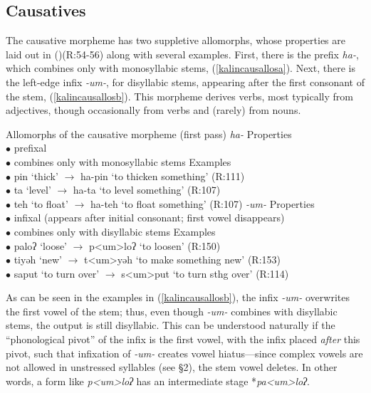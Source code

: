 \documentclass[output=paper,colorlinks,citecolor=brown,
]{langscibook}
\newcounter{nexttmp}    %
\newcommand{\Next}{\setcounter{nexttmp}{\value{equation}}\stepcounter{nexttmp}(\thenexttmp)\xspace}
\begin{document}
\subsection{Causatives}

The causative morpheme has two suppletive allomorphs, whose properties are laid out in \Next (R:54-56) along with several examples. First, there is the prefix  \textit{ha-}, which combines only with monosyllabic stems, (\ref{kalincausallosa}). Next, there is the left-edge infix \textit{-um-}, for disyllabic stems, appearing after the first consonant of the stem, (\ref{kalincausallosb}). This morpheme derives verbs, most typically from adjectives, though occasionally from verbs and (rarely) from nouns.

\ea Allomorphs of the causative morpheme (first pass) \label{kalincausallos}
\ea \textit{ha-}\label{kalincausallosa}
\ea  Properties\\
$\bullet$ prefixal\\
$\bullet$ combines only with monosyllabic stems
\ex Examples\\
$\bullet$ pin `thick' $\rightarrow$ ha-pin `to thicken something' \hfill (R:111)\\
$\bullet$ ta `level' $\rightarrow$ ha-ta `to level something' \hfill (R:107)\\
$\bullet$ teh `to float' $\rightarrow$ ha-teh `to float something' \hfill (R:107)
\z
\ex \textit{-um-} \label{kalincausallosb}
\ea Properties\\
$\bullet$ infixal (appears after initial consonant; first vowel disappears)\\
$\bullet$ combines only with disyllabic stems
\ex Examples\\
$\bullet$ paloʔ `loose' $\rightarrow$ p<um>loʔ `to loosen' \hfill (R:150)\\
$\bullet$ tiyəh `new' $\rightarrow$ t<um>yəh `to make something new' \hfill (R:153)\\
$\bullet$ saput `to turn over' $\rightarrow$ s<um>put `to turn sthg over' \hfill (R:114)
\z
\z
\z

As can be seen in the examples in (\ref{kalincausallosb}), the infix \textit{-um-} overwrites the first vowel of the stem; thus, even though \textit{-um-} combines with disyllabic stems, the output is still disyllabic. This can be understood naturally if the ``phonological pivot'' \citep{Yu07} of the infix is the first vowel, with the infix placed {\it after} this pivot, such that infixation of \textit{-um-} creates vowel hiatus---since complex vowels are not allowed in unstressed syllables (see \S2), the stem vowel deletes. In other words, a form like \textit{p<um>loʔ} has an intermediate stage *\textit{pa<um>loʔ}.
\end{document}
